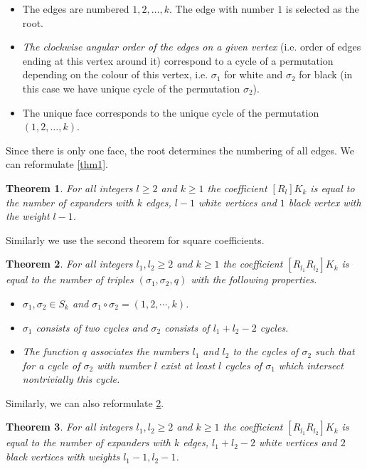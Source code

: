 \documentclass[submission]{FPSAC2021}
\newtheorem{theorem}{Theorem}
\begin{document}
\begin{itemize}

\item The edges are numbered $1, 2, \dots, k$.
The edge with number $1$ is selected as the root.

\item \emph{The clockwise angular order of the 
edges on a given vertex} (i.e. order of edges 
ending at this vertex around it) correspond to 
a cycle of a permutation
depending on the colour of this vertex, i.e. 
$\sigma_1$ for white and $\sigma_2$ for black
(in this case we have unique cycle of 
the permutation $\sigma_2$). 

\item The unique face corresponds to the unique 
cycle of the permutation $(1, 2, \ldots, k)$.

\end{itemize}
Since there is only one face, the root determines the 
numbering of all edges. We can reformulate \cref{thm1}.
\begin{theorem}
\label{thm2}
For all integers $l\geq2$ and $k\geq 1$ the 
coefficient $[R_l] K_k$ is equal to the number 
of expanders with $k$ edges, $l-1$ white vertices 
and $1$ black vertex with the weight $l-1$.
\end{theorem}
Similarly we use the second theorem for square coefficients.
\begin{theorem}
\label{thm3}
For all integers $l_1, l_2\geq 2$ and $k\geq 1$ 
the coefficient $[R_{l_1} R_{l_2}] K_k$ is equal 
to the number of triples $(\sigma_1, \sigma_2, q)$ 
with the following properties.
\begin{itemize}

\item $\sigma_1, \sigma_2 \in S_k$ 
and $\sigma_1\circ\sigma_2=(1,2,\cdots, k)$.

\item $\sigma_1$ consists of two cycles and 
$\sigma_2$ consists of $l_1+l_2-2$ cycles.

\item The function $q$ associates the numbers 
$l_1$ and $l_2$ to the cycles of $\sigma_2$ 
such that for a cycle of $\sigma_2$ with number 
$l$ exist 
at least $l$ cycles of $\sigma_1$ which 
intersect nontrivially this cycle.
\end{itemize}
\end{theorem}
Similarly, we can also reformulate  \cref{thm3}.
\begin{theorem}
\label{thm4}
For all integers $l_1, l_2\geq 2$ and $k\geq 1$ 
the coefficient $[R_{l_1} R_{l_2}] K_k$ is equal 
to the number of expanders with $k$ edges, 
$l_1+l_2-2$ white vertices and $2$ black 
vertices with weights $l_1-1, l_2-1$.
\end{theorem}
\end{document}
